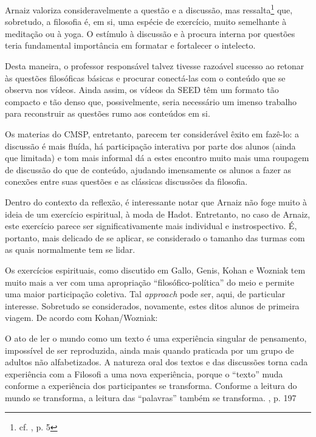 \documentclass[12pt,a4paper]{article}
\newenvironment{citac}{\begin{addmargin}[4cm]{1em} \footnotesize}{\normalfont \end{addmargin}}
\begin{document}
	Arnaiz valoriza consideravelmente a questão e a discussão, mas 
	ressalta\footnote{cf. \cite{arnaiz}, p. 5} que, sobretudo, a 
	filosofia é, em si, uma espécie de exercício, muito semelhante 
	à meditação ou à yoga. O estímulo à discussão e à procura interna 
	por questões teria fundamental importância em formatar e fortalecer 
	o intelecto. 

	Desta maneira, o professor responsável talvez tivesse razoável 
	sucesso ao retonar às questões filosóficas básicas e procurar 
	conectá-las com o conteúdo que se observa nos vídeos. Ainda assim, 
	os vídeos da SEED têm um formato tão compacto e tão denso que, 
	possivelmente, seria necessário um imenso trabalho para reconstruir 
	as questões rumo aos conteúdos em si. 

	Os materias do CMSP, entretanto, parecem ter considerável êxito 
	em fazê-lo: a discussão é mais fluída, há participação interativa por 
	parte dos alunos (ainda que limitada) e tom mais informal dá a estes 
	encontro muito mais uma roupagem de discussão do que de conteúdo, 
	ajudando imensamente os alunos a fazer as conexões entre suas questões 
	e as clássicas discussões da filosofia. 

	Dentro do contexto da reflexão, é interessante notar que Arnaiz 
	não foge muito à ideia de um exercício espiritual, à moda de Hadot. 
	Entretanto, no caso de Arnaiz, este exercício parece ser 
	significativamente mais individual e instrospectivo. É, portanto, 
	mais delicado de se aplicar, se considerado o tamanho das turmas 
	com as quais normalmente tem se lidar. 

	Os exercícios espirituais, como discutido em Gallo, Genis, Kohan 
	e Wozniak tem muito mais a ver com uma apropriação 
	“filosófico-política” do meio e permite uma maior participação 
	coletiva. Tal \emph{approach} pode ser, aqui, de particular 
	interesse. Sobretudo se considerados, novamente, estes ditos 
	alunos de primeira viagem. De acordo com Kohan/Wozniak: 

	\begin{citac}
	O ato de ler o mundo como um texto é uma experiência singular de
pensamento, impossível de ser reproduzida, ainda mais quando praticada por um
grupo de adultos não alfabetizados. A natureza oral dos textos e das discussões
torna cada experiência com a Filosofi a uma nova experiência, porque o “texto”
muda conforme a experiência dos participantes se transforma. Conforme a leitura
do mundo se transforma, a leitura das “palavras” também se transforma.
	\cite{wozkoh}, p. 197
	\end{citac}
\end{document}
